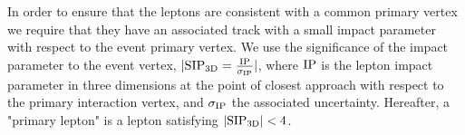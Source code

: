  In order to ensure that the leptons are consistent with a common primary vertex we require that they have an associated track with a small impact parameter with respect to the event primary vertex.  
We use the significance of the impact parameter to the event vertex, $ | {\rm SIP_{3D}} = \frac{\rm IP}{\sigma_{\rm IP}} |$, where ${\rm IP}$ is the lepton impact parameter in three dimensions at the point of closest approach with respect to the primary interaction vertex, and $\sigma_{\rm IP}$ the associated uncertainty.  Hereafter, a "primary lepton" is a lepton satisfying $| {\rm SIP_{3D}} | < 4$.               
